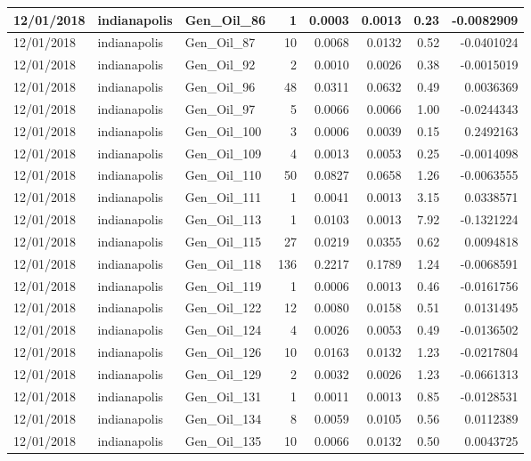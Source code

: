 \documentclass[
  letterpaper,
  DIV=11,
  numbers=noendperiod]{scrartcl}
\begin{document}
\begin{tabular}{l|l|l|r|r|r|r|r}
\hline
12/01/2018 & indianapolis & Gen\_Oil\_86 & 1 & 0.0003 & 0.0013 & 0.23 & -0.0082909\\
\hline
12/01/2018 & indianapolis & Gen\_Oil\_87 & 10 & 0.0068 & 0.0132 & 0.52 & -0.0401024\\
\hline
12/01/2018 & indianapolis & Gen\_Oil\_92 & 2 & 0.0010 & 0.0026 & 0.38 & -0.0015019\\
\hline
12/01/2018 & indianapolis & Gen\_Oil\_96 & 48 & 0.0311 & 0.0632 & 0.49 & 0.0036369\\
\hline
12/01/2018 & indianapolis & Gen\_Oil\_97 & 5 & 0.0066 & 0.0066 & 1.00 & -0.0244343\\
\hline
12/01/2018 & indianapolis & Gen\_Oil\_100 & 3 & 0.0006 & 0.0039 & 0.15 & 0.2492163\\
\hline
12/01/2018 & indianapolis & Gen\_Oil\_109 & 4 & 0.0013 & 0.0053 & 0.25 & -0.0014098\\
\hline
12/01/2018 & indianapolis & Gen\_Oil\_110 & 50 & 0.0827 & 0.0658 & 1.26 & -0.0063555\\
\hline
12/01/2018 & indianapolis & Gen\_Oil\_111 & 1 & 0.0041 & 0.0013 & 3.15 & 0.0338571\\
\hline
12/01/2018 & indianapolis & Gen\_Oil\_113 & 1 & 0.0103 & 0.0013 & 7.92 & -0.1321224\\
\hline
12/01/2018 & indianapolis & Gen\_Oil\_115 & 27 & 0.0219 & 0.0355 & 0.62 & 0.0094818\\
\hline
12/01/2018 & indianapolis & Gen\_Oil\_118 & 136 & 0.2217 & 0.1789 & 1.24 & -0.0068591\\
\hline
12/01/2018 & indianapolis & Gen\_Oil\_119 & 1 & 0.0006 & 0.0013 & 0.46 & -0.0161756\\
\hline
12/01/2018 & indianapolis & Gen\_Oil\_122 & 12 & 0.0080 & 0.0158 & 0.51 & 0.0131495\\
\hline
12/01/2018 & indianapolis & Gen\_Oil\_124 & 4 & 0.0026 & 0.0053 & 0.49 & -0.0136502\\
\hline
12/01/2018 & indianapolis & Gen\_Oil\_126 & 10 & 0.0163 & 0.0132 & 1.23 & -0.0217804\\
\hline
12/01/2018 & indianapolis & Gen\_Oil\_129 & 2 & 0.0032 & 0.0026 & 1.23 & -0.0661313\\
\hline
12/01/2018 & indianapolis & Gen\_Oil\_131 & 1 & 0.0011 & 0.0013 & 0.85 & -0.0128531\\
\hline
12/01/2018 & indianapolis & Gen\_Oil\_134 & 8 & 0.0059 & 0.0105 & 0.56 & 0.0112389\\
\hline
12/01/2018 & indianapolis & Gen\_Oil\_135 & 10 & 0.0066 & 0.0132 & 0.50 & 0.0043725\\

\end{tabular}
\end{document}
